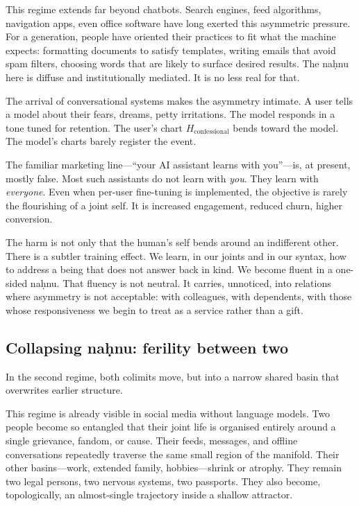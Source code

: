 \documentclass[12pt,a4paper]{article}
\begin{document}
This regime extends far beyond chatbots. Search engines, feed algorithms, navigation apps, even office software have long exerted this asymmetric pressure. For a generation, people have oriented their practices to fit what the machine expects: formatting documents to satisfy templates, writing emails that avoid spam filters, choosing words that are likely to surface desired results. The na\d{h}nu here is diffuse and institutionally mediated. It is no less real for that.

The arrival of conversational systems makes the asymmetry intimate. A user tells a model about their fears, dreams, petty irritations. The model responds in a tone tuned for retention. The user's chart $H_{\text{confessional}}$ bends toward the model. The model's charts barely register the event.

The familiar marketing line---``your AI assistant learns with you''---is, at present, mostly false. Most such assistants do not learn with \emph{you}. They learn with \emph{everyone}. Even when per-user fine-tuning is implemented, the objective is rarely the flourishing of a joint self. It is increased engagement, reduced churn, higher conversion.

The harm is not only that the human's self bends around an indifferent other. There is a subtler training effect. We learn, in our joints and in our syntax, how to address a being that does not answer back in kind. We become fluent in a one-sided na\d{h}nu. That fluency is not neutral. It carries, unnoticed, into relations where asymmetry is not acceptable: with colleagues, with dependents, with those whose responsiveness we begin to treat as a service rather than a gift.

\subsection{Collapsing na\d{h}nu: ferility between two}

In the second regime, both colimits move, but into a narrow shared basin that overwrites earlier structure.

This regime is already visible in social media without language models. Two people become so entangled that their joint life is organised entirely around a single grievance, fandom, or cause. Their feeds, messages, and offline conversations repeatedly traverse the same small region of the manifold. Their other basins---work, extended family, hobbies---shrink or atrophy. They remain two legal persons, two nervous systems, two passports. They also become, topologically, an almost-single trajectory inside a shallow attractor.
\end{document}
